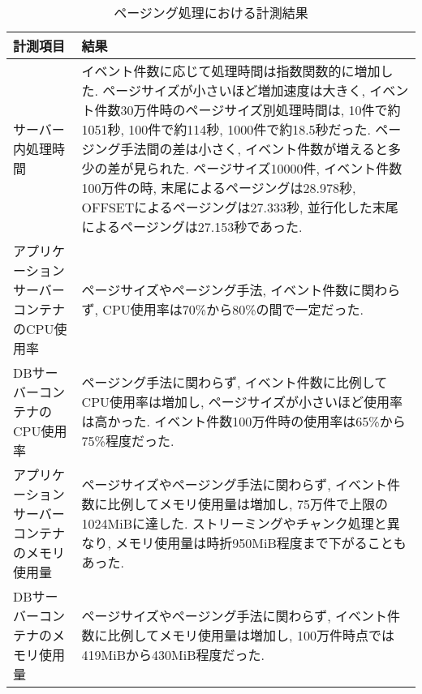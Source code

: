 \documentclass[../../../main]{subfiles}
\begin{document}
    \begin{table}[H]
        \centering
        \caption{ページング処理における計測結果}
        \label{tab:result-paging}
        \begin{tabular}{|p{4cm}|p{10cm}|}
            \hline
            \textbf{計測項目}                & \textbf{結果}                                                                                                                                                                                                                                     \\ \hline
            サーバー内処理時間                    & イベント件数に応じて処理時間は指数関数的に増加した. ページサイズが小さいほど増加速度は大きく, イベント件数30万件時のページサイズ別処理時間は, 10件で約1051秒, 100件で約114秒, 1000件で約18.5秒だった. ページング手法間の差は小さく, イベント件数が増えると多少の差が見られた. ページサイズ10000件, イベント件数100万件の時, 末尾によるページングは28.978秒, OFFSETによるページングは27.333秒, 並行化した末尾によるページングは27.153秒であった.  \\ \hline
            アプリケーションサーバーコンテナのCPU使用率      & ページサイズやページング手法, イベント件数に関わらず, CPU使用率は70\%から80\%の間で一定だった.                                                                                                                                                                                             \\ \hline
            DBサーバーコンテナのCPU使用率            & ページング手法に関わらず, イベント件数に比例してCPU使用率は増加し, ページサイズが小さいほど使用率は高かった. イベント件数100万件時の使用率は65\%から75\%程度だった.                                                                                                                                                          \\ \hline
            アプリケーションサーバーコンテナのメモリ使用量      & ページサイズやページング手法に関わらず, イベント件数に比例してメモリ使用量は増加し, 75万件で上限の1024MiBに達した. ストリーミングやチャンク処理と異なり, メモリ使用量は時折950MiB程度まで下がることもあった.                                                                                                                                    \\ \hline
            DBサーバーコンテナのメモリ使用量            & ページサイズやページング手法に関わらず, イベント件数に比例してメモリ使用量は増加し, 100万件時点では419MiBから430MiB程度だった.                                                                                                                                                                           \\ \hline

\end{tabular}
\end{table}
\end{document}
